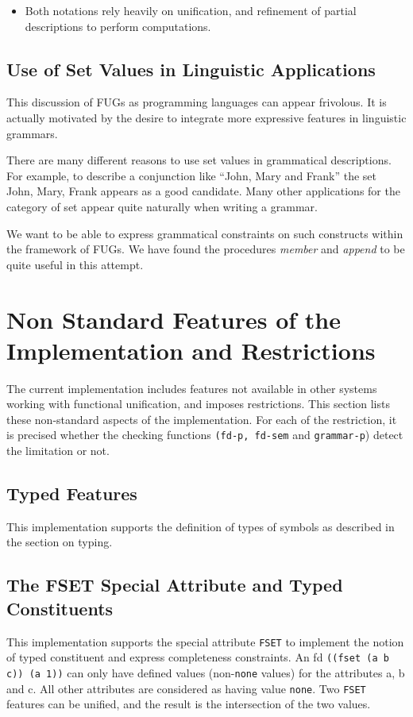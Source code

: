 \documentclass[10pt,a4paper]{report}
\begin{document}
\begin{appendices}
\begin{itemize}
\item Both notations rely heavily on unification, and refinement of
partial descriptions to perform computations.
\end{itemize}


\section{Use of Set Values in Linguistic Applications}

This discussion of FUGs as programming languages can appear
frivolous. It is actually motivated by the desire to integrate
more expressive features in linguistic grammars. 

There are many different reasons to use set values in grammatical
descriptions. For example, to describe a conjunction like ``John,
Mary and Frank'' the set {John, Mary, Frank} appears as a good
candidate. Many other applications for the category of set appear
quite naturally when writing a grammar.

We want to be able to express grammatical constraints on such
constructs within the framework of FUGs. We have found the
procedures {\em member} and {\em append} to be quite useful in this
attempt. 



\chapter{Non Standard Features of the Implementation and Restrictions}
\label{sect-non-standard}

The current implementation includes features not available in other systems
working with functional unification, and imposes restrictions.  This
section lists these non-standard aspects of the implementation. For each of
the restriction, it is precised whether the checking functions {\tt (fd-p,
fd-sem} and {\tt grammar-p}) detect the limitation or not.

\section{Typed Features}
This implementation supports the definition of types of symbols as
described in the section on typing.

\section{The FSET Special Attribute and Typed Constituents}
This implementation supports the special attribute {\tt FSET} to implement
the notion of typed constituent and express completeness constraints.  
An fd {\tt ((fset (a b c)) (a 1))} can only have defined values (non-{\tt none}
values) for the attributes a, b and c.  All other attributes are considered
as having value {\tt none}.  Two {\tt FSET} features can be unified, and the
result is the intersection of the two values.  


\end{appendices}
\end{document}

